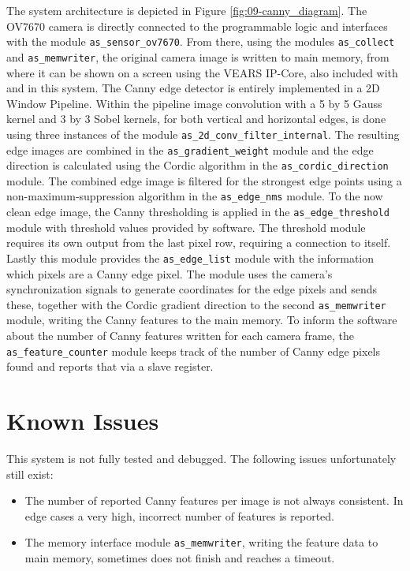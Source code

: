 The system architecture is depicted in Figure \ref{fig:09-canny_diagram}.
The OV7670 camera is directly connected to the programmable logic and interfaces with the \asterics module \texttt{as\_sensor\_ov7670}.
From there, using the modules \texttt{as\_collect} and \texttt{as\_memwriter}, the original camera image is written to main memory, from where it can be shown on a screen using the VEARS IP-Core, also included with \asterics and in this system.
The Canny edge detector is entirely implemented in a 2D Window Pipeline.
Within the pipeline image convolution with a 5 by 5 Gauss kernel and 3 by 3 Sobel kernels, for both vertical and horizontal edges, is done using three instances of the module \texttt{as\_2d\_conv\_filter\_internal}.
The resulting edge images are combined in the \texttt{as\_gradient\_weight} module and the edge direction is calculated using the Cordic algorithm in the \texttt{as\_cordic\_direction} module.
The combined edge image is filtered for the strongest edge points using a non-maximum-suppression algorithm in the \texttt{as\_edge\_nms} module.
To the now clean edge image, the Canny thresholding is applied in the \texttt{as\_edge\_threshold} module with threshold values provided by software.
The threshold module requires its own output from the last pixel row, requiring a connection to itself.
Lastly this module provides the \texttt{as\_edge\_list} module with the information which pixels are a Canny edge pixel.
The module uses the camera's synchronization signals to generate coordinates for the edge pixels and sends these, together with the Cordic gradient direction to the second \texttt{as\_memwriter} module, writing the Canny features to the main memory.
To inform the software about the number of Canny features written for each camera frame, the \texttt{as\_feature\_counter} module keeps track of the number of Canny edge pixels found and reports that via a slave register.

\section{Known Issues}
\label{sec:09-canny_issues}

This system is not fully tested and debugged.
The following issues unfortunately still exist:

\begin{itemize}
\item The number of reported Canny features per image is not always consistent. In edge cases a very high, incorrect number of features is reported.
\item The memory interface module \texttt{as\_memwriter}, writing the feature data to main memory, sometimes does not finish and reaches a timeout.
\end{itemize}


